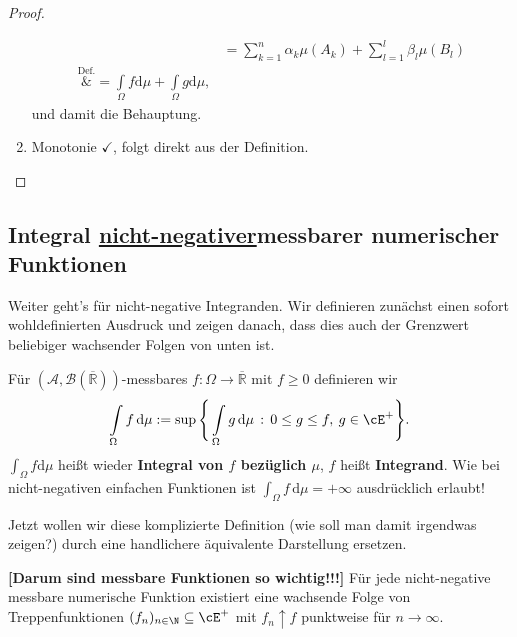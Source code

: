 \begin{proof}
\begin{enumerate}[label=(\roman*)]
\begin{align*}
			&= \sum\limits_{k = 1}^{n} \alpha_k \mu(A_k) + \sum\limits_{l = 1}^{l} \beta_l \mu(B_l)\\
			 \overset{\text{Def.}}&{=} \int\limits_{\Omega} f \mathrm{d}\mu + \int\limits_{\Omega} g \mathrm{d}\mu,
		\end{align*}
		und damit die Behauptung.
		\item Monotonie $\checkmark$, folgt direkt aus der Definition.
	\end{enumerate}
\end{proof}

\subsection*{Integral \underline{nicht-negativer}\platz messbarer numerischer Funktionen}
Weiter geht's f\"ur nicht-negative Integranden. Wir definieren zun\"achst einen sofort wohldefinierten Ausdruck und zeigen danach, dass dies auch der Grenzwert beliebiger wachsender Folgen von unten ist.
\begin{deff}
	Für $(\mathcal A, \mathcal B(\overline{\mathbb R}))$-messbares  $f : \Omega\to \overline{\mathbb{R}}$ mit $f\geq 0$ definieren wir
	\[ \int\limits_{\Omega} f\, \mathrm{d}\mu := \sup \Bigg\{ \int\limits_{\Omega} g \,\mathrm{d}\mu \, : \, 0\leq g \leq f, \: g \in \cE^+ \Bigg\}. \]
$\int_\Omega f\mathrm{d}\mu$ hei\ss t wieder \textbf{Integral von $f$ bez\"uglich $\mu$}, $f$ hei\ss t \textbf{Integrand}. Wie bei nicht-negativen einfachen Funktionen ist $\int_{\Omega} f\, \mathrm{d}\mu = +\infty$ ausdr\"ucklich erlaubt!
\end{deff}
Jetzt wollen wir diese komplizierte Definition (wie soll man damit irgendwas zeigen?) durch eine handlichere \"aquivalente Darstellung ersetzen.
\begin{satz}\label{k}
\textbf{[Darum sind messbare Funktionen so wichtig!!!]}
	Für jede nicht-negative messbare numerische Funktion existiert eine wachsende Folge von Treppenfunktionen $(f_n)_{n \in \N} \subseteq \cE^+$ mit $f_n \uparrow f$ punktweise f\"ur $n \to \infty$.
\end{satz}

